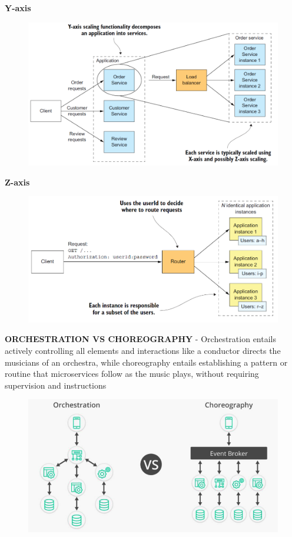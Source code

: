 \pagebreak
\textbf{Y-axis}
\begin{figure}[ht!]
\centering
\includegraphics[width=\textwidth]{oborove/SWA/img/y_axis.png}
\end{figure}


\textbf{Z-axis}
\begin{figure}[ht!]
\centering
\includegraphics[width=\textwidth]{oborove/SWA/img/z_axis.png}
\end{figure}
\pagebreak

\textbf{ORCHESTRATION VS CHOREOGRAPHY} - Orchestration entails actively controlling all elements and interactions like a conductor directs the musicians of an orchestra, while choreography entails establishing a pattern or routine that microservices follow as the music plays, without requiring supervision and instructions
\begin{figure}[ht!]
\centering
\includegraphics[width=\textwidth]{oborove/SWA/img/orch-vs-chor.png}
\end{figure}
\pagebreak

